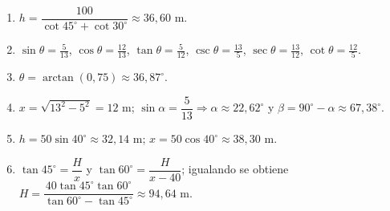 \documentclass[12pt, letterpaper]{article}
\providecommand{\sen}{\sin}
\begin{document}
\begin{enumerate}[leftmargin=*, label=\textbf{\arabic*.}]
  \item $h=\dfrac{100}{\cot 45^{\circ}+\cot 30^{\circ}}\approx 36{,}60$ m.
  \item $\sen\theta=\frac{5}{13}$, $\cos\theta=\frac{12}{13}$, $\tan\theta=\frac{5}{12}$, $\csc\theta=\frac{13}{5}$, $\sec\theta=\frac{13}{12}$, $\cot\theta=\frac{12}{5}$.
  \item $\theta=\arctan\left(0{,}75\right)\approx 36{,}87^{\circ}$.
  \item $x=\sqrt{13^2-5^2}=12$ m; $\sen\alpha=\dfrac{5}{13}\Rightarrow\alpha\approx 22{,}62^{\circ}$ y $\beta=90^{\circ}-\alpha\approx 67{,}38^{\circ}$.
  \item $h=50\sen 40^{\circ}\approx 32{,}14$ m; $x=50\cos 40^{\circ}\approx 38{,}30$ m.
  \item $\tan 45^{\circ}=\dfrac{H}{x}$ y $\tan 60^{\circ}=\dfrac{H}{x-40}$; igualando se obtiene $H=\dfrac{40\tan 45^{\circ}\tan 60^{\circ}}{\tan 60^{\circ}-\tan 45^{\circ}}\approx 94{,}64$ m.
\end{enumerate}
\end{document}
